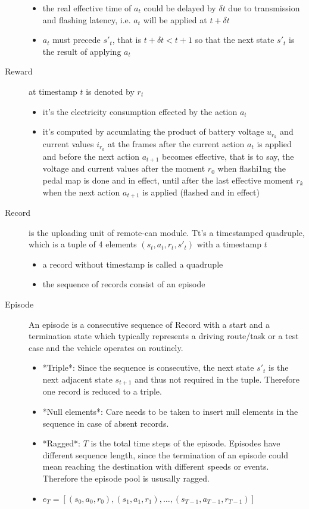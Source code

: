 \documentclass{article}
\begin{document}
\begin{description}
\begin{itemize}
		      \item the real effective time of $a_t$ could be delayed by $\delta t$ due to transmission and flashing latency, i.e. $a_t$ will be applied at $t+\delta t$
		      \item $a_t$ must precede $s'_t$, that is $t+\delta t < t+1$ so that the next state $s'_t$ is the result of applying $a_t$
	      \end{itemize}
	\item[Reward] at timestamp $t$ is denoted by $r_t$
	      \begin{itemize}
		      \item it's the electricity consumption effected by the action $a_t$
		      \item it's computed by accumlating the product of battery voltage $u_{r_k}$ and current values $i_{r_k}$ at the frames after the current action $a_t$ is applied and before the next action $a_{t+1}$ becomes effective, that is to say, the voltage and current values after the moment $r_0$  when flashi1ng the pedal map is done and in effect, until after the last effective moment $r_k$  when the next action $a_{t+1}$ is applied (flashed and in effect)
	      \end{itemize}
	\item[Record] is the uploading unit of remote-can module. Tt's a timestamped quadruple, which is a tuple of 4 elements $(s_t, a_t, r_t, s'_t)$ with a timestamp $t$
	      \begin{itemize}
		      \item a record without timestamp is called a quadruple
		      \item the sequence of records consist of an episode
	      \end{itemize}
	\item[Episode] An episode is a consecutive sequence of Record with a start and a termination state which typically represents a driving route/task or a test case and the vehicle operates on routinely.
	      \begin{itemize}
		      \item *Triple*: Since the sequence is consecutive, the next state $s'_t$ is the next adjacent state $s_{t+1}$ and thus not required in the tuple. Therefore one record is reduced to a triple.
		      \item *Null elements*: Care needs to be taken to insert null elements in the sequence in case of absent records.
		      \item *Ragged*: $T$ is the total time steps of the episode. Episodes have different sequence length, since the termination of an episode could mean reaching the destination with different speeds or events. Therefore the episode pool  is ususally ragged.
		      \item $e_T=[(s_0,a_0,r_0),(s_1,a_1,r_1), \ldots,(s_{T-1},a_{T-1},r_{T-1})]$
	      \end{itemize}
\end{description}
\end{document}
